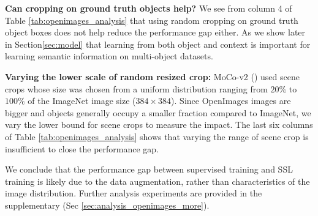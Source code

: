 \textbf{Can cropping on ground truth objects help?} 
We see from column 4 of Table \ref{tab:openimages_analysis} that using random cropping on ground truth object boxes does not help reduce the performance gap either. As we show later in Section\ref{sec:model} that learning from both object and context is important for learning semantic information on multi-object datasets. 

\textbf{Varying the lower scale of random resized crop:}  MoCo-v2 (\cite{chen2020improved}) used scene crops whose size was chosen from a uniform distribution ranging from $20\%$ to $100\%$ of the ImageNet image size ($384 \times 384$). Since OpenImages images are bigger and objects generally occupy a smaller fraction compared to ImageNet, we vary the lower bound for scene crops to measure the impact. The last six columns of Table \ref{tab:openimages_analysis} shows that varying the range of scene crop is insufficient to close the performance gap. 

We conclude that the performance gap between supervised training and SSL training is likely due to the data augmentation, rather than characteristics of the image distribution. Further analysis experiments are provided in the supplementary (Sec \ref{sec:analysis_openimages_more}). 


      

